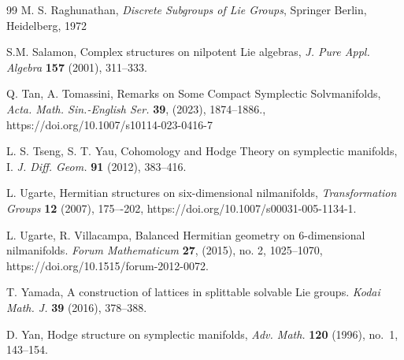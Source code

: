 \documentclass[a4paper, 11pt]{amsart}
\theoremstyle{plain}
\theoremstyle{definition}
\numberwithin{equation}{section}
\begin{document}
\begin{thebibliography}{99}
 M. S. Raghunathan, \textit{Discrete Subgroups of Lie Groups}, Springer Berlin, Heidelberg, 1972

 S.M. Salamon, Complex structures on nilpotent Lie algebras, \textit{J. Pure Appl. Algebra} \textbf{157} (2001),
311--333.

 Q. Tan, A. Tomassini, Remarks on Some Compact Symplectic Solvmanifolds, \textit{Acta. Math. Sin.-English Ser.} \textbf{39}, (2023), 1874--1886., https://doi.org/10.1007/s10114-023-0416-7

 L. S. Tseng, S. T. Yau, Cohomology and Hodge Theory on symplectic manifolds, I. {\em J. Diff. Geom.} \textbf{91} (2012), 383--416.

 L. Ugarte, Hermitian structures on six-dimensional nilmanifolds, \textit{Transformation Groups} \textbf{12} (2007), 175–-202, https://doi.org/10.1007/s00031-005-1134-1.

 L. Ugarte, R. Villacampa, Balanced Hermitian geometry on 6-dimensional nilmanifolds. \textit{Forum Mathematicum} \textbf{27}, (2015), no. 2, 1025--1070, https://doi.org/10.1515/forum-2012-0072.

 T. Yamada, A construction of lattices in splittable solvable Lie groups. \textit{Kodai Math. J.} \textbf{39} (2016), 378--388.

 D. Yan, Hodge structure on symplectic manifolds,
{\em Adv. Math.} \textbf{120} (1996), no.~1, 143--154.

\end{thebibliography}
\end{document}
